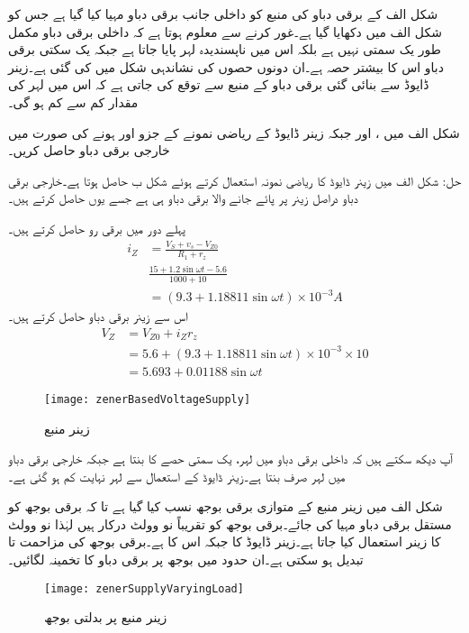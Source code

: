 

شکل  الف  کے برقی دباو کی منبع کو داخلی جانب برقی دباو مہیا کیا گیا ہے جس کو شکل  الف میں دکھایا گیا ہے۔غور کرنے سے معلوم ہوتا ہے کہ داخلی برقی دباو مکمل طور یک سمتی نہیں ہے بلکہ اس میں ناپسندیدہ لہر  پایا جاتا ہے جبکہ یک سکتی برقی دباو   اس کا بیشتر حصہ ہے۔ان دونوں حصوں کی نشاندہی شکل میں کی گئی ہے۔زینر ڈایوڈ سے بنائی گئی برقی دباو کے منبع سے توقع کی جاتی ہے کہ اس میں لہر کی مقدار کم سے کم ہو گی۔

شکل  الف میں ،  اور  جبکہ زینر ڈایوڈ کے ریاضی نمونے کے جزو  اور  ہونے کی صورت میں خارجی برقی دباو  حاصل کریں۔

حل:	شکل  الف میں زینر ڈایوڈ کا ریاضی نمونہ استعمال کرتے ہوئے شکل  ب حاصل ہوتا ہے۔خارجی برقی دباو دراصل زینر پر پائے جانے والا برقی دباو  ہی ہے جسے یوں حاصل کرتے ہیں۔

پہلے دور میں برقی رو حاصل کرتے ہیں۔
\begin{align*}
i_Z&=\frac{V_S+v_s-V_{Z0}}{R_1+r_z}\\
&\frac{15+1.2 \sin \omega t -5.6}{1000+10}\\
&=\left (9.3+1.18811 \sin \omega t \right ) \times 10^{-3} A
\end{align*}
اس سے زینر برقی دباو حاصل کرتے ہیں۔
\begin{align*}
V_Z&=V_{Z0}+i_Z r_z\\
&=5.6+\left (9.3+1.18811 \sin \omega t \right ) \times 10^{-3} \times 10\\
&=5.693+0.01188 \sin \omega t
\end{align*}
%
\begin{figure}
\centering
\texttt{[image: zenerBasedVoltageSupply]}
\caption{زینر منبع}
\label{شکل_زینر_منبع}
\end{figure}
آپ دیکھ سکتے ہیں کہ داخلی برقی دباو میں لہر، یک سمتی حصے کا    بنتا ہے جبکہ خارجی برقی دباو میں لہر صرف   بنتا ہے۔زینر ڈایوڈ کے استعمال سے لہر نہایت کم ہو گئی ہے۔

شکل  الف میں زینر منبع کے متوازی برقی بوجھ  نسب کیا گیا ہے تا کہ برقی بوجھ کو مستقل برقی دباو مہیا کی جائے۔برقی بوجھ کو تقریباً نو وولٹ درکار ہیں لہٰذا نو وولٹ کا زینر استعمال کیا جاتا ہے۔زینر ڈایوڈ کا  جبکہ اس کا  ہے۔برقی بوجھ کی مزاحمت  تا  تبدیل ہو سکتی ہے۔ان حدود میں بوجھ پر برقی دباو  کا تخمینہ لگائیں۔
\begin{figure}
\centering
\texttt{[image: zenerSupplyVaryingLoad]}
\caption{زینر منبع پر بدلتی بوجھ}
\label{شکل_زینر_منبع_بدلتا_بار}
\end{figure}


